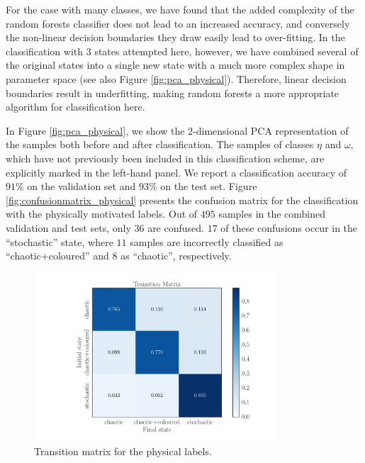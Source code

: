 \documentclass[fleqn,usenatbib]{mnras}
\begin{document}
 For the case with many classes, we have found that the added complexity of the random forests classifier does not lead to an increased accuracy, and conversely the non-linear decision boundaries they draw easily lead to over-fitting. In the classification with $3$ states attempted here, however, we have combined several of the original states into a single new state with a much more complex shape in parameter space (see also Figure \ref{fig:pca_physical}). Therefore, linear decision boundaries result in underfitting, making random forests a more appropriate algorithm for classification here. 

In Figure \ref{fig:pca_physical}, we show the 2-dimensional PCA representation of the samples both before and after classification. The samples of classes $\eta$ and $\omega$, which have not previously been included in this classification scheme, are explicitly marked in the left-hand panel. 
We report a classification accuracy of $91\%$ on the validation set and $93\%$ on the test set. Figure \ref{fig:confusionmatrix_physical} presents the confusion matrix for the classification with the physically motivated labels.
Out of $495$ samples in the combined validation and test sets, only $36$ are confused. $17$ of these confusions occur in the ``stochastic'' state, where $11$ samples are incorrectly 
classified as ``chaotic+coloured'' and $8$ as ``chaotic'', respectively. 
\begin{figure}
\begin{center}
\includegraphics[width=9cm]{grs1915_supervised_phys_transmat.pdf}
\caption{Transition matrix for the physical labels.} 
\label{fig:transmat_phys}
\end{center}
\end{figure}
\end{document}
